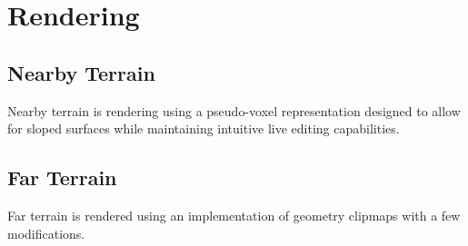 
\chapter{Rendering}

\section{Nearby Terrain}

Nearby terrain is rendering using a pseudo-voxel representation designed to allow for sloped surfaces while maintaining intuitive live editing capabilities.

\section{Far Terrain}

Far terrain is rendered using an implementation of geometry clipmaps with a few modifications.
